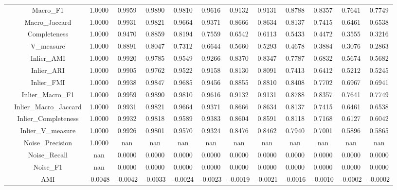 \begin{table}[ht!]
\begin{tabular*}{\linewidth}{@{} lc c c c c c c c c c c c @{}}
 & Macro_F1  & 1.0000 & 0.9959 & 0.9890 & 0.9810 & 0.9616 & 0.9132 & 0.9131 & 0.8788 & 0.8357 & 0.7641 & 0.7749 \\

 & Macro_Jaccard  & 1.0000 & 0.9931 & 0.9821 & 0.9664 & 0.9371 & 0.8666 & 0.8634 & 0.8137 & 0.7415 & 0.6461 & 0.6538 \\

 & Completeness  & 1.0000 & 0.9470 & 0.8859 & 0.8194 & 0.7559 & 0.6542 & 0.6113 & 0.5433 & 0.4472 & 0.3555 & 0.3216 \\

 & V_measure  & 1.0000 & 0.8891 & 0.8047 & 0.7312 & 0.6644 & 0.5660 & 0.5293 & 0.4678 & 0.3884 & 0.3076 & 0.2863 \\

 & Inlier_AMI  & 1.0000 & 0.9920 & 0.9785 & 0.9549 & 0.9266 & 0.8370 & 0.8347 & 0.7787 & 0.6832 & 0.5674 & 0.5682 \\

 & Inlier_ARI  & 1.0000 & 0.9905 & 0.9762 & 0.9522 & 0.9158 & 0.8130 & 0.8091 & 0.7413 & 0.6412 & 0.5212 & 0.5245 \\

 & Inlier_FMI  & 1.0000 & 0.9938 & 0.9847 & 0.9685 & 0.9456 & 0.8855 & 0.8810 & 0.8408 & 0.7702 & 0.6967 & 0.6941 \\

 & Inlier_Macro_F1  & 1.0000 & 0.9959 & 0.9890 & 0.9810 & 0.9616 & 0.9132 & 0.9131 & 0.8788 & 0.8357 & 0.7641 & 0.7749 \\

 & Inlier_Macro_Jaccard  & 1.0000 & 0.9931 & 0.9821 & 0.9664 & 0.9371 & 0.8666 & 0.8634 & 0.8137 & 0.7415 & 0.6461 & 0.6538 \\

 & Inlier_Completeness  & 1.0000 & 0.9932 & 0.9818 & 0.9589 & 0.9383 & 0.8604 & 0.8591 & 0.8118 & 0.7168 & 0.6127 & 0.6042 \\

 & Inlier_V_measure  & 1.0000 & 0.9926 & 0.9801 & 0.9570 & 0.9324 & 0.8476 & 0.8462 & 0.7940 & 0.7001 & 0.5896 & 0.5865 \\

 & Noise_Precision  & 1.0000 & nan & nan & nan & nan & nan & nan & nan & nan & nan & nan \\

 & Noise_Recall  & nan & 0.0000 & 0.0000 & 0.0000 & 0.0000 & 0.0000 & 0.0000 & 0.0000 & 0.0000 & 0.0000 & 0.0000 \\

 & Noise_F1  & nan & 0.0000 & 0.0000 & 0.0000 & 0.0000 & 0.0000 & 0.0000 & 0.0000 & 0.0000 & 0.0000 & 0.0000 \\
\addlinespace
\multirow{17}{*}{GMM}
 & AMI  & -0.0048 & -0.0042 & -0.0033 & -0.0024 & -0.0023 & -0.0019 & -0.0021 & -0.0016 & -0.0010 & -0.0002 & -0.0002 \\


\end{tabular*}
\end{table}
